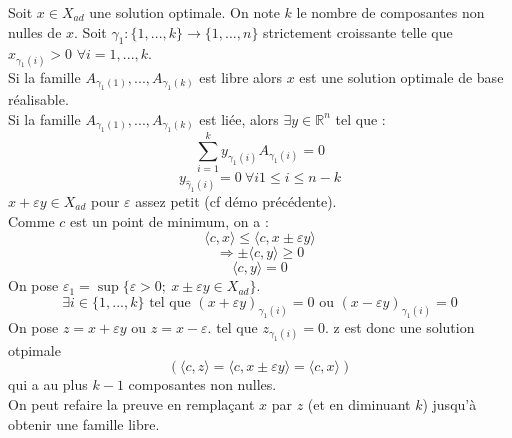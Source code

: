 
\begin{dem}
Soit $x\in X_{ad}$ une solution optimale. On note $k$ le nombre de composantes non nulles de $x$. Soit $\gamma_1:\{1,...,k\}\to \{1,...,n\}$ strictement croissante telle que $x_{\gamma_1(i)}>0$ $\forall i=1,...,k$.\\
Si la famille $A_{\gamma_1(1)},...,A_{\gamma_1(k)}$ est libre alors $x$ est une solution optimale de base réalisable.\\
Si la famille $A_{\gamma_1(1)},...,A_{\gamma_1(k)}$ est liée, alors $\exists y\in\mathbb{R}^n$ tel que :
	\[\sum_{i=1}^k y_{\gamma_1(i)} A_{\gamma_1(i)}=0\]
	\[y_{\hat{\gamma}_1(i)}=0\ \forall i 1\leq i\leq n-k\]
$x+\varepsilon y\in X_{ad}$ pour $\varepsilon$ assez petit (cf démo précédente). \\
Comme $c$ est un point de minimum, on a :
	\[\langle c,x\rangle \leq \langle c, x\pm \varepsilon y\rangle\]
	\[\Rightarrow \pm\langle c, y\rangle \geq 0\]
	\[\langle c,y\rangle=0\]
On pose $\varepsilon_1=\sup\{\varepsilon>0;\ x\pm\varepsilon y\in X_{ad}\}$. 
	\[\exists i\in \{1,...,k\} \text{ tel que } (x+\varepsilon y)_{\gamma_1(i)}=0 \text{ ou } (x-\varepsilon y)_{\gamma_1(i)}=0\]
On pose $z=x+\varepsilon y$ ou $z=x-\varepsilon$. tel que $z_{\gamma_1(i)}=0$. z est donc une solution otpimale 
\[(\langle c,z\rangle=\langle c,x\pm\varepsilon y\rangle = \langle c,x\rangle)\]
qui a au plus $k-1$ composantes non nulles.\\
On peut refaire la preuve en remplaçant $x$ par $z$ (et en diminuant $k$) jusqu'à obtenir une famille libre.
\end{dem}
